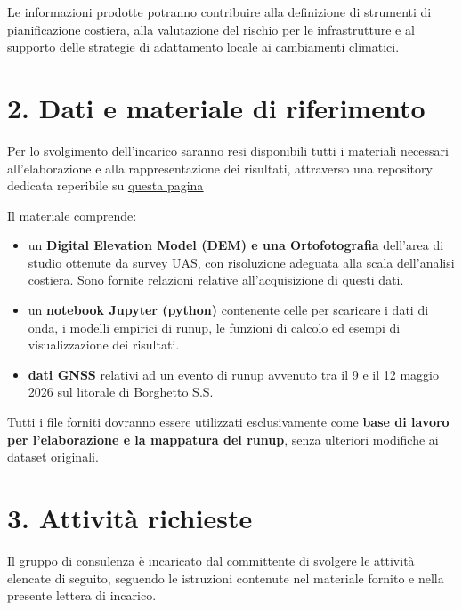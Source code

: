 \documentclass[11pt,a4paper,roman]{moderncv}
\begin{document}
Le informazioni prodotte potranno contribuire alla definizione di strumenti di pianificazione costiera, alla valutazione del rischio per le infrastrutture e al supporto delle strategie di adattamento locale ai cambiamenti climatici.

\clearpage

\section*{2. Dati e materiale di riferimento}
Per lo svolgimento dell’incarico saranno resi disponibili tutti i materiali necessari all’elaborazione e alla rappresentazione dei risultati, attraverso una repository dedicata reperibile su \underline{\href{https://github.com/Alerovere/Esercitazione_GGG.git}{questa pagina}}

Il materiale comprende:
\begin{itemize}
  \item un \textbf{Digital Elevation Model (DEM) e una Ortofotografia} dell’area di studio ottenute da survey UAS, con risoluzione adeguata alla scala dell’analisi costiera. Sono fornite relazioni relative all'acquisizione di questi dati.
  \item un \textbf{notebook Jupyter (python)} contenente celle per scaricare i dati di onda, i modelli empirici di runup, le funzioni di calcolo ed esempi di visualizzazione dei risultati.
  \item \textbf{dati GNSS} relativi ad un evento di runup avvenuto tra il 9 e il 12 maggio 2026 sul litorale di Borghetto S.S.
\end{itemize}

Tutti i file forniti dovranno essere utilizzati esclusivamente come \textbf{base di lavoro per l’elaborazione e la mappatura del runup}, senza ulteriori modifiche ai dataset originali.

\section*{3. Attività richieste}
Il gruppo di consulenza è incaricato dal committente di svolgere le attività elencate di seguito, seguendo le istruzioni contenute nel materiale fornito e nella presente lettera di incarico.  \\[1em]
\end{document}
